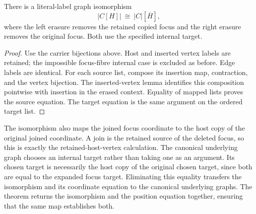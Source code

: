 \begin{theorem}
There is a literal-label graph isomorphism
\[
  \bigl|C[H]\bigr|\ \cong\ |C|[\overline H],
\]
where the left erasure removes the retained copied focus and the right erasure
removes the original focus. Both use the specified internal target.
\end{theorem}
\begin{proof}
Use the carrier bijections above. Host and inserted vertex labels are retained;
the impossible focus-fibre internal case is excluded as before. Edge labels
are identical. For each source list, compose its insertion map, contraction,
and the vertex bijection. The inserted-vertex lemma identifies this composition
pointwise with insertion in the erased context. Equality of mapped lists proves
the source equation. The target equation is the same argument on the ordered
target list.
\end{proof}
The isomorphism also maps the joined focus coordinate to the host copy of the
original joined coordinate. A join is the retained source of the deleted focus,
so this is exactly the retained-host-vertex calculation.
The canonical underlying graph chooses an internal target rather than taking
one as an argument. Its chosen target is necessarily the host copy of the
original chosen target, since both are equal to the expanded focus target.
Eliminating this equality transfers the isomorphism and its coordinate equation
to the canonical underlying graphs. The theorem returns the isomorphism and
the position equation together, ensuring that the same map establishes both.


